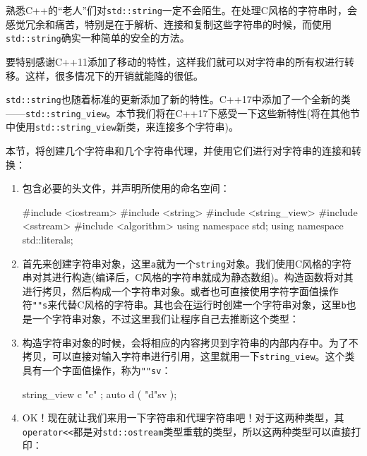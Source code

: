 熟悉C++的“老人”们对\texttt{std::string}一定不会陌生。在处理C风格的字符串时，会感觉冗余和痛苦，特别是在于解析、连接和复制这些字符串的时候，而使用\texttt{std::string}确实一种简单的安全的方法。

要特别感谢C++11添加了移动的特性，这样我们就可以对字符串的所有权进行转移。这样，很多情况下的开销就能降的很低。

\texttt{std::string}也随着标准的更新添加了新的特性。C++17中添加了一个全新的类——\texttt{std::string\_view}。本节我们将在C++17下感受一下这些新特性(将在其他节中使用\texttt{std::string\_view}新类，来连接多个字符串)。


本节，将创建几个字符串和几个字符串代理，并使用它们进行对字符串的连接和转换：

\begin{enumerate}
\item 包含必要的头文件，并声明所使用的命名空间：

\begin{codebox}[cpp]
#include <iostream>
#include <string>
#include <string_view>
#include <sstream>
#include <algorithm>
using namespace std; 
using namespace std::literals;
\end{codebox}

\item 首先来创建字符串对象，这里\texttt{a}就为一个\texttt{string}对象。我们使用C风格的字符串对其进行构造(编译后，C风格的字符串就成为静态数组)。构造函数将对其进行拷贝，然后构成一个字符串对象。或者也可直接使用字符字面值操作符\texttt{""s}来代替C风格的字符串。其也会在运行时创建一个字符串对象，这里\texttt{b}也是一个字符串对象，不过这里我们让程序自己去推断这个类型：

\begin{codebox}[cpp]
int main()
{
    string a { "a" };
    auto b ( "b"s ); 
\end{codebox}

\item 构造字符串对象的时候，会将相应的内容拷贝到字符串的内部内存中。为了不拷贝，可以直接对输入字符串进行引用，这里就用一下\texttt{string\_view}。这个类具有一个字面值操作，称为\texttt{""sv}：

\begin{codebox}[cpp]
    string_view c { "c" };
    auto d ( "d"sv );
\end{codebox}

\item OK！现在就让我们来用一下字符串和代理字符串吧！对于这两种类型，其\texttt{operator<<}都是对\texttt{std::ostream}类型重载的类型，所以这两种类型可以直接打印：


\end{enumerate}

